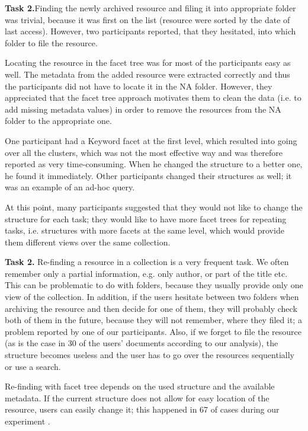 \documentclass{article}
\begin{document}
\textbf{Task 2.}Finding the newly archived resource and filing it into appropriate folder was trivial, because it was first on the list (resource were sorted by the date of last access). However, two participants reported, that they hesitated, into which folder to file the resource. 

Locating the resource in the facet tree was for most of the participants easy as well. The metadata from the added resource were extracted correctly and thus the participants did not have to locate it in the NA folder. However, they appreciated that the facet tree approach motivates them to clean the data (i.e. to add missing metadata values) in order to remove the resources from the NA folder to the appropriate one. 

One participant had a Keyword facet at the first level, which resulted into going over all the clusters, which was not the most effective way and was therefore reported as very time-consuming. When he changed the structure to a better one, he found it immediately. Other participants changed their structures as well; it was an example of an ad-hoc query.

  At this point, many participants suggested that they would not like to change the structure for each task; they would like to have more facet trees for repeating tasks, i.e. structures with more facets at the same level, which would provide them different views over the same collection. 

\textbf{Task 2.} Re-finding a resource in a collection is a very frequent task. We often remember only a partial information, e.g. only author, or part of the title etc. This can be problematic to do with folders, because they usually provide only one view of the collection. In addition, if the users hesitate between two folders when archiving the resource and then decide for one of them, they will probably check both of them in the future, because they will not remember, where they filed it; a problem reported by one of our participants. Also, if we forget to file the resource (as is the case in 30 of the users’ documents according to our analysis), the structure becomes useless and the user has to go over the resources sequentially or use a search. 

Re-finding with facet tree depends on the used structure and the available metadata. If the current structure does not allow for easy location of the resource, users can easily change it; this happened in 67 of cases during our experiment . 
\end{document}
